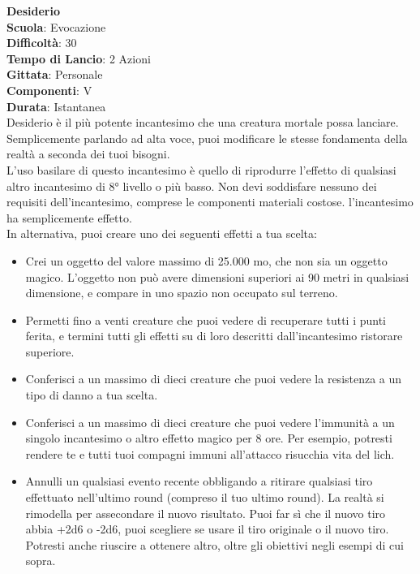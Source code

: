 \begin{multicols}{2}
\medskip\textbf{Desiderio}\\
\textbf{Scuola}: Evocazione\\
\textbf{Difficoltà}:  30\\
\textbf{Tempo di Lancio}: 2 Azioni\\
\textbf{Gittata}: Personale\\
\textbf{Componenti}: V\\
\textbf{Durata}: Istantanea\\
Desiderio è il più potente incantesimo che una creatura mortale possa lanciare. Semplicemente parlando ad alta voce, puoi modificare le stesse fondamenta della realtà a seconda dei tuoi bisogni. \\
L’uso basilare di questo incantesimo è quello di riprodurre l’effetto di qualsiasi altro incantesimo di 8° livello o più basso. Non devi soddisfare nessuno dei requisiti dell'incantesimo, comprese le componenti materiali costose. l'incantesimo ha semplicemente
effetto.\\
In alternativa, puoi creare uno dei seguenti effetti a tua
scelta:
\begin{itemize}
	\item 
Crei un oggetto del valore massimo di 25.000 mo, che non sia un oggetto magico. L’oggetto non può avere dimensioni superiori ai 90 metri in qualsiasi dimensione, e compare in uno spazio non occupato sul terreno.
	\item 
Permetti fino a venti creature che puoi vedere di recuperare tutti i punti ferita, e termini tutti gli effetti su di loro descritti dall'incantesimo ristorare superiore. 
	\item 
Conferisci a un massimo di dieci creature che puoi vedere la resistenza a un tipo di danno a tua scelta.
	\item 
Conferisci a un massimo di dieci creature che puoi vedere l’immunità a un singolo incantesimo o altro effetto magico per 8 ore. Per esempio, potresti rendere te e tutti tuoi compagni immuni all'attacco risucchia vita del lich.
	\item 
Annulli un qualsiasi evento recente obbligando a ritirare qualsiasi tiro effettuato nell'ultimo round (compreso il tuo ultimo round). La realtà si rimodella per assecondare il nuovo risultato. Puoi far sì che il nuovo tiro abbia +2d6 o -2d6, puoi scegliere se usare il tiro originale o il nuovo tiro. Potresti anche riuscire a ottenere altro, oltre gli obiettivi negli esempi di cui sopra.\\
\end{itemize}

\end{multicols}

